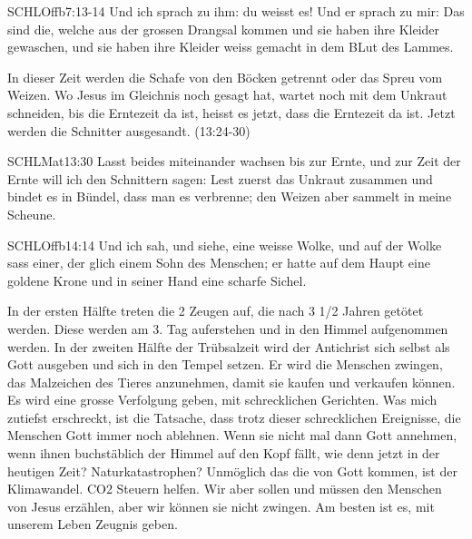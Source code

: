 \begin{otsblock}
\begin{bibelbox}{SCHL}{Offb}{7:13-14}
            Und ich sprach zu ihm: du weisst es! Und er sprach zu mir: Das sind die, welche aus der grossen Drangsal kommen und sie haben ihre Kleider gewaschen, und sie haben ihre Kleider weiss gemacht in dem BLut des Lammes.
        \end{bibelbox}
        In dieser Zeit werden die Schafe von den Böcken getrennt oder das Spreu vom Weizen. Wo Jesus im Gleichnis noch gesagt hat, wartet noch mit dem Unkraut schneiden, bis die Erntezeit da ist, heisst es jetzt, dass die Erntezeit da ist. Jetzt werden die Schnitter ausgesandt. (13:24-30)
         \begin{bibelbox}{SCHL}{Mat}{13:30}
            Lasst beides miteinander wachsen bis zur Ernte, und zur Zeit der Ernte will ich den Schnittern sagen: Lest zuerst das Unkraut zusammen und bindet es in Bündel, dass man es verbrenne; den Weizen aber sammelt in meine Scheune.
        \end{bibelbox}
         \begin{bibelbox}{SCHL}{Offb}{14:14}
            Und ich sah, und siehe, eine weisse Wolke, und auf der Wolke sass einer, der glich einem Sohn des Menschen; er hatte auf dem Haupt eine goldene Krone und in seiner Hand eine scharfe Sichel.
        \end{bibelbox}
        In der ersten Hälfte treten die 2 Zeugen auf, die nach 3 1/2 Jahren getötet werden. Diese werden am 3. Tag auferstehen und in den Himmel aufgenommen werden. In der zweiten Hälfte der Trübsalzeit wird der Antichrist sich selbst als Gott ausgeben und sich in den Tempel setzen. Er wird die Menschen zwingen, das Malzeichen des Tieres anzunehmen, damit sie kaufen und verkaufen können. Es wird eine grosse Verfolgung geben, mit schrecklichen Gerichten. Was mich zutiefst erschreckt, ist die Tatsache, dass trotz dieser schrecklichen Ereignisse, die Menschen Gott immer noch ablehnen.
        Wenn sie nicht mal dann Gott annehmen, wenn ihnen buchstäblich der Himmel auf den Kopf fällt, wie denn jetzt in der heutigen Zeit? Naturkatastrophen? Unmöglich das die von Gott kommen, ist der Klimawandel. CO2 Steuern helfen. Wir aber sollen und müssen den Menschen von Jesus erzählen, aber wir können sie nicht zwingen. Am besten ist es, mit unserem Leben Zeugnis geben. 
        
    \end{otsblock}
